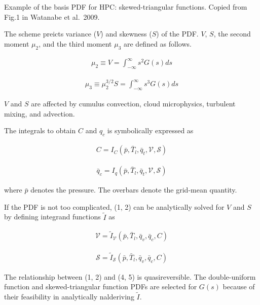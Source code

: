 Example of the basis PDF for HPC: skewed-triangular functions. Copied
from Fig.1 in Watanabe et al.~2009.

The scheme preicts variance (\(V\)) and skewness (\(S\)) of the PDF.
\(V\), \(S\), the second moment \(\mu_2\), and the third moment
\(\mu_3\) are defined as follows.

\begin{eqnarray}
\mu_{2} \equiv V=\int_{-\infty}^{\infty} s^{2} G(s) ds
\end{eqnarray}

\begin{eqnarray}
\mu_{3} \equiv \mu_{2}^{3 / 2} S=\int_{-\infty}^{\infty} s^{3} G(s) d s
\end{eqnarray}

\(V\) and \(S\) are affected by cumulus convection, cloud microphysics,
turbulent mixing, and advection.

The integrals to obtain \(C\) and \(q_c\) is symbolically expressed as

\begin{eqnarray}
C=I_{C}\left(\bar{p}, \bar{T}_{l}, \bar{q}_{t}, \mathcal{V}, \mathcal{S}\right)
\label{W09-1}
\end{eqnarray}

\begin{eqnarray}
\bar{q}_{c}=I_{q}\left(\bar{p}, \bar{T}_{l}, \bar{q}_{t}, \mathcal{V}, \mathcal{S}\right)
\label{W09-2}
\end{eqnarray}

where \(\bar{p}\) denotes the pressure. The overbars denote the
grid-mean quantity.

If the PDF is not too complicated, (1, 2) can be analytically solved for
\(V\) and \(S\) by defining integrand functions \({\tilde{I}}\) as

\begin{eqnarray}
\mathcal{V}=\tilde{I}_{\mathcal{V}} \left(\bar{p}, \bar{T}_{l}, \bar{{q}}_{v}, \bar{q}_{c}, C\right)
\label{W09-4}
\end{eqnarray}

\begin{eqnarray}
\mathcal{S}=\tilde{I}_{\mathcal{S}} \left(\bar{p}, \bar{T}_{l}, \bar{{q}}_{v}, \bar{q}_{c}, C\right)
\label{W09-5}
\end{eqnarray}

The relationship between (1, 2) and (4, 5) is quasireversible. The
double-uniform function and skewed-triangular function PDFs are selected
for \(G(s)\) because of their feasibility in analytically nalderiving
\({\tilde{I}}\).

